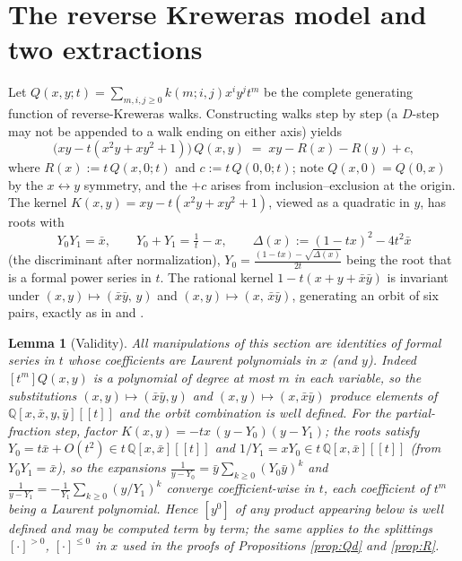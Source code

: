 \documentclass[11pt]{article}
\newtheorem{lemma}[theorem]{Lemma}
\newcommand{\bx}{\bar x}\newcommand{\by}{\bar y}
\begin{document}
\section{The reverse Kreweras model and two extractions}\label{sec:kernel}
Let $Q(x,y;t) = \sum_{m,i,j\ge0} k(m;i,j)x^iy^jt^m$ be the complete generating function of reverse-Kreweras walks. Constructing walks step by step (a $D$-step may not be appended to a walk ending on either axis) yields
\begin{equation}\label{eq:FE}
\big(xy - t(x^2y+xy^2+1)\big)\,Q(x,y) \;=\; xy - R(x) - R(y) + c,
\end{equation}
where $R(x) := t\,Q(x,0;t)$ and $c := t\,Q(0,0;t)$; note $Q(x,0)=Q(0,x)$ by the $x\leftrightarrow y$ symmetry, and the $+c$ arises from inclusion--exclusion at the origin. The kernel $K(x,y) = xy - t(x^2y+xy^2+1)$, viewed as a quadratic in $y$, has roots with
\[ Y_0Y_1 = \bx,\qquad Y_0+Y_1 = \tfrac1t - x,\qquad \Delta(x) := (1-tx)^2 - 4t^2\bx \]
(the discriminant after normalization), $Y_0 = \frac{(1-tx)-\sqrt{\Delta(x)}}{2t}$ being the root that is a formal power series in $t$. The rational kernel $1-t(x+y+\bx\by)$ is invariant under $(x,y)\mapsto(\bx\by,\,y)$ and $(x,y)\mapsto(x,\,\bx\by)$, generating an orbit of six pairs, exactly as in \cite[\S2.3]{BM05} and \cite[\S2.3]{Mishna}.

\begin{lemma}[Validity]\label{lem:valid}
All manipulations of this section are identities of formal series in $t$ whose coefficients are Laurent polynomials in $x$ (and $y$). Indeed $[t^m]Q(x,y)$ is a polynomial of degree at most $m$ in each variable, so the substitutions $(x,y)\mapsto(\bx\by,y)$ and $(x,y)\mapsto(x,\bx\by)$ produce elements of $\mathbb{Q}[x,\bx,y,\by][[t]]$ and the orbit combination is well defined. For the partial-fraction step, factor $K(x,y) = -tx\,(y-Y_0)(y-Y_1)$; the roots satisfy $Y_0 = t\bx + O(t^2) \in t\,\mathbb{Q}[x,\bx][[t]]$ and $1/Y_1 = xY_0 \in t\,\mathbb{Q}[x,\bx][[t]]$ (from $Y_0Y_1=\bx$), so the expansions
$\frac{1}{y-Y_0} = \by\sum_{k\ge0}(Y_0\by)^k$ and $\frac{1}{y-Y_1} = -\frac1{Y_1}\sum_{k\ge0}(y/Y_1)^k$
converge coefficient-wise in $t$, each coefficient of $t^m$ being a Laurent polynomial. Hence $[y^0]$ of any product appearing below is well defined and may be computed term by term; the same applies to the splittings $[\cdot]^{>0}$, $[\cdot]^{\le 0}$ in $x$ used in the proofs of Propositions \ref{prop:Qd} and \ref{prop:R}.
\end{lemma}
\end{document}
